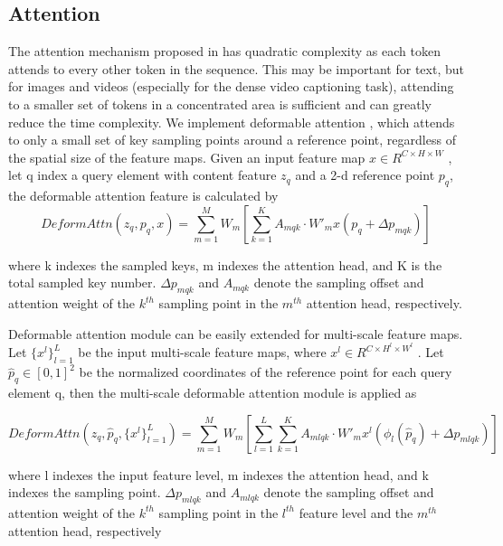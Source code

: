 \subsection{Attention}
\par The attention mechanism proposed in \cite{tfm} has quadratic complexity as each token attends to every other token in the sequence. This may be important for text, but for images and videos (especially for the dense video captioning task), attending to a smaller set of tokens in a concentrated area is sufficient and can greatly reduce the time complexity. 
We implement deformable attention \cite{zhu2020deformable}, which attends to only a small set of key sampling points around a reference point, regardless of the spatial
size of the feature maps. Given an input feature map $x \in R^{C\times H \times W}$ , let q index a query element with content feature $z_q$ and a 2-d reference point $p_q$, the deformable attention feature is calculated by
$$ DeformAttn(z_q, p_q, x) = \displaystyle\sum\limits_{m=1}^M W_m
[\displaystyle\sum\limits_{k=1}^K A_{mqk}\cdot W'_mx(p_q+\Delta p_{mqk})]
$$
\par where k indexes the sampled keys, m indexes the attention head, and K is the total sampled key number. $\Delta p_{mqk}$ and $A_{mqk}$ denote the sampling offset and attention weight of the $k^{th}$ sampling point in the $m^{th}$ attention head, respectively.
\par Deformable attention module can be easily extended for multi-scale feature maps. Let $\{{x^l}\}_{l=1}^L$ be the input multi-scale feature maps, where  $x^l \in R^{C\times H^l \times W^l}$ . Let $ \hat p_q \in [0, 1]^2$ be the normalized coordinates of the reference point for each query element q, then the multi-scale deformable attention module is applied as

$$DeformAttn(z_q, \hat{p}_q, \{{x^l}\}_{l=1}^L) = 
\displaystyle\sum\limits_{m=1}^M W_m
[\displaystyle\sum\limits_{l=1}^L\displaystyle\sum\limits_{k=1}^K A_{mlqk}\cdot W'_mx^l(\phi _l (\hat p_q)+\Delta p_{mlqk})]$$

\par where l indexes the input feature level, m indexes the attention head, and k indexes the sampling point. $\Delta p_{mlqk}$ and $A_{mlqk}$ denote the sampling offset and attention weight of the $k^{th}$ sampling point in the $l^{th}$ feature level and the $m^{th}$ attention head, respectively

